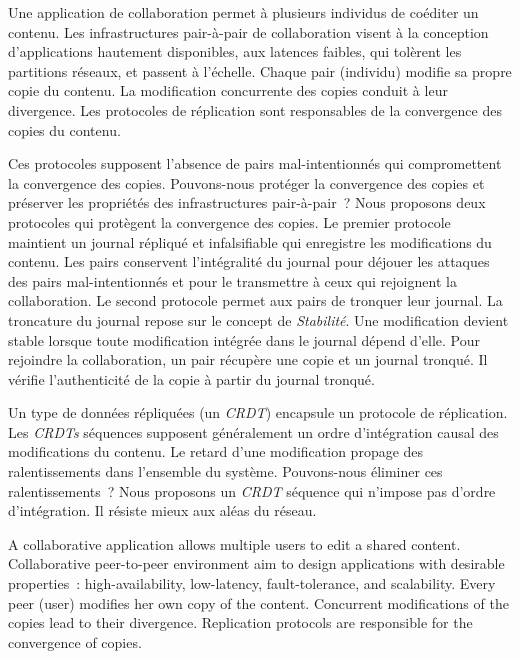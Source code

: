 \begin{ThesisAbstract}
\begin{FrenchAbstract}
Une application de collaboration permet à plusieurs individus de coéditer un contenu.
Les infrastructures pair-à-pair de collaboration visent à la conception d’applications hautement disponibles, aux latences faibles, qui tolèrent les partitions réseaux, et passent à l’échelle.
Chaque pair (individu) modifie sa propre copie du contenu.
La modification concurrente des copies conduit à leur divergence.
Les protocoles de réplication sont responsables de la convergence des copies du contenu.

Ces protocoles supposent l'absence de pairs mal-intentionnés qui compromettent la convergence des copies.
Pouvons-nous protéger la convergence des copies et préserver les propriétés des infrastructures pair-à-pair~?
Nous proposons deux protocoles qui protègent la convergence des copies.
Le premier protocole maintient un journal répliqué et infalsifiable qui enregistre les modifications du contenu.
Les pairs conservent l’intégralité du journal pour déjouer les attaques des pairs mal-intentionnés et pour le transmettre à ceux qui rejoignent la collaboration.
Le second protocole permet aux pairs de tronquer leur journal.
La troncature du journal repose sur le concept de \emph{Stabilité}.
Une modification devient stable lorsque toute modification intégrée dans le journal dépend d'elle.
Pour rejoindre la collaboration, un pair récupère une copie et un journal tronqué.
Il vérifie l'authenticité de la copie à partir du journal tronqué.

Un type de données répliquées (un \emph{CRDT}) encapsule un protocole de réplication.
Les \emph{CRDTs} séquences supposent généralement un ordre d'intégration causal des modifications du contenu.
Le retard d'une modification propage des ralentissements dans l'ensemble du système.
Pouvons-nous éliminer ces ralentissements~?
Nous proposons un \emph{CRDT} séquence qui n'impose pas d'ordre d'intégration.
Il résiste mieux aux aléas du réseau.

\end{FrenchAbstract}


\begin{EnglishAbstract}
A collaborative application allows multiple users to edit a shared content.
Collaborative peer-to-peer environment aim to design applications with desirable properties~: high-availability, low-latency, fault-tolerance, and scalability.
Every peer (user) modifies her own copy of the content.
Concurrent modifications of the copies lead to their divergence.
Replication protocols are responsible for the convergence of copies.


\end{EnglishAbstract}
\end{ThesisAbstract}
